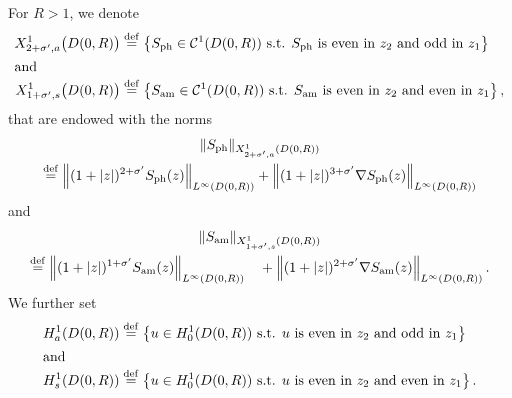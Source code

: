 \documentclass[AHL,Unicode,longabstracts,published]{cedram}
\newcommand*\ddef{\stackrel{\rm def}{=}}
\newcommand{\amm}{\mathrm{am}}
\newcommand{\phl}{\mathrm{ph}}
\newcommand*\BC{\mathcal{C}}
\newcommand*\ii{\infty}
\newcommand*\s{\sigma}
\begin{document}
For $ R > 1$, we denote
\begin{align*}
X^{1}_{2+\s', a} \big(D(0,R) \big)
&\ddef \left\{ S_{\phl} \in \BC^1 (D(0,R)) \text{ s.t. } S_{\phl} \text{ is even in } z_2
\text{ and odd in } z_1 \right\}
\\
\intertext{and}
X^{1}_{1+\s', s} \big(D(0,R) \big)
&\ddef \left\{ S_{\amm} \in \BC^1 (D(0,R)) \text{ s.t. } S_{\amm} \text{ is even in } z_2
\text{ and even in } z_1 \right\},
\end{align*}
that are endowed with the norms
\begin{multline*}
\| S_{\phl} \|_{ X^{1}_{2+\s', a} (D(0,R)) }\\  \ddef
\left\| (1 + |z|)^{2+\s'} S_{\phl} (z)\right\|_{ L^\ii (D(0,R)) }
+ \left\| (1 + |z|)^{3+\s'} \nabla S_{\phl}(z) \right\|_{ L^\ii (D(0,R)) }
\end{multline*}
and
\begin{multline*}
\| S_{\amm} \|_{ X^{1}_{1+\s', s} (D(0,R)) } \\  \ddef
\left\| (1 + |z|)^{1+\s'} S_{\amm} (z)\right\|_{ L^\ii (D(0,R)) }
 \quad + \left\| (1 + |z|)^{2+\s'} \nabla S_{\amm}(z) \right\|_{ L^\ii (D(0,R)) }.
\end{multline*}
We further set
\begin{align*}
H^{1}_a (D(0,R)) &\ddef \left\{ u \in H^{1}_0 (D(0,R)) \text{ s.t. } u \text{ is even in } z_2
\text{ and odd in } z_1 \right\}
\\
\intertext{and}
H^{1}_s (D(0,R)) &\ddef \left\{ u \in H^{1}_0 (D(0,R)) \text{ s.t. } u \text{ is even in } z_2
\text{ and even in } z_1 \right\}.
\end{align*}
\end{document}
